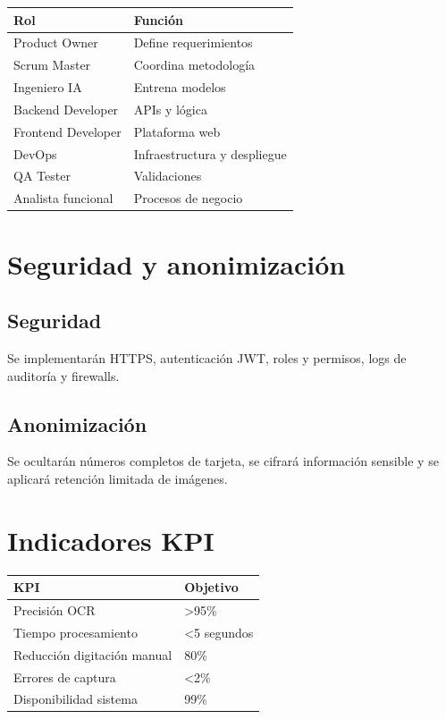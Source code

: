 \documentclass[12pt]{article}
\begin{document}
\begin{longtable}{|p{5cm}|p{8cm}|}
\hline
\textbf{Rol} & \textbf{Función} \\
\hline
Product Owner & Define requerimientos \\
\hline
Scrum Master & Coordina metodología \\
\hline
Ingeniero IA & Entrena modelos \\
\hline
Backend Developer & APIs y lógica \\
\hline
Frontend Developer & Plataforma web \\
\hline
DevOps & Infraestructura y despliegue \\
\hline
QA Tester & Validaciones \\
\hline
Analista funcional & Procesos de negocio \\
\hline
\end{longtable}

\section{Seguridad y anonimización}

\subsection{Seguridad}

Se implementarán HTTPS, autenticación JWT, roles y permisos, logs de auditoría y firewalls.

\subsection{Anonimización}

Se ocultarán números completos de tarjeta, se cifrará información sensible y se aplicará retención limitada de imágenes.

\section{Indicadores KPI}

\begin{longtable}{|p{7cm}|p{5cm}|}
\hline
\textbf{KPI} & \textbf{Objetivo} \\
\hline
Precisión OCR & >95\% \\
\hline
Tiempo procesamiento & <5 segundos \\
\hline
Reducción digitación manual & 80\% \\
\hline
Errores de captura & <2\% \\
\hline
Disponibilidad sistema & 99\% \\
\hline
\end{longtable}
\end{document}
